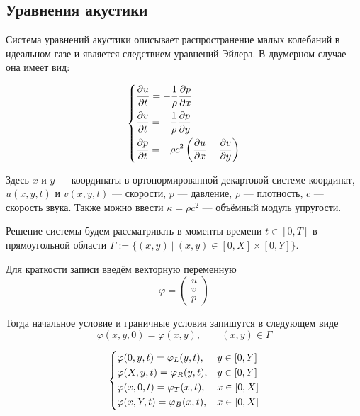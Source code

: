 \subsection{Уравнения акустики}

Система уравнений акустики описывает распространение малых колебаний в идеальном газе и является следствием уравнений Эйлера. В двумерном случае она имеет вид:

\begin{equation}
\begin{dcases}
	\frac{\partial u}{\partial t} = -\frac{1}{\rho}\frac{\partial p}{\partial x} \\
	\frac{\partial v}{\partial t} = -\frac{1}{\rho}\frac{\partial p}{\partial y} \\
    \frac{\partial p}{\partial t} = -\rho c^2 \left(\frac{\partial u}{\partial x} + \frac{\partial v}{\partial y}\right) \\
\end{dcases}
\label{eq:acoustic}
\end{equation}

Здесь $x$ и $y$ --- координаты в ортонормированной декартовой системе координат, $u(x,y,t)$ и $v(x,y,t)$ --- скорости, $p$ --- давление, $\rho$ --- плотность, $c$ --- скорость звука. Также можно ввести $\kappa = \rho c^2$ --- объёмный модуль упругости.

Решение системы будем рассматривать в моменты времени $t \in [0, T]$ в прямоугольной области $\Gamma := \{(x,y) ~|~ (x,y) \in [0, X]\times [0, Y]\}$.

Для краткости записи введём векторную переменную  
\begin{equation}
	\varphi = \begin{pmatrix} u \\ v \\ p \end{pmatrix}
\end{equation}

Тогда начальное условие и граничные условия запишутся в следующем виде
\begin{equation}
    \varphi(x,y,0) = \varphi(x,y) ,\qquad (x,y) \in \Gamma
    \label{eq:phi}
\end{equation}

\begin{equation}
\begin{dcases}
    \varphi(0,y,t) = \varphi_L (y,t) , & y \in [0,Y]\\
    \varphi(X,y,t) = \varphi_R (y,t) , & y \in [0,Y]\\
    \varphi(x,0,t) = \varphi_T (x,t) , & x \in [0,X]\\
    \varphi(x,Y,t) = \varphi_B (x,t) , & x \in [0,X]
\end{dcases}
\end{equation}

